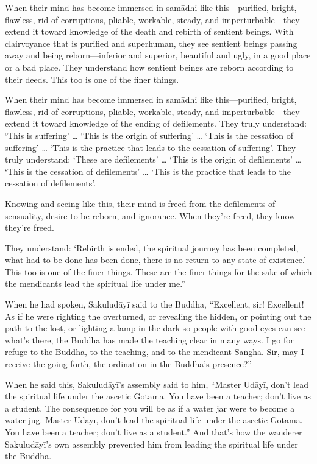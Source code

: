 \documentclass[12pt,openany]{book}%
\begin{document}
When their mind has become immersed in \textsanskrit{samādhi} like this—purified, bright, flawless, rid of corruptions, pliable, workable, steady, and imperturbable—they extend it toward knowledge of the death and rebirth of sentient beings. With clairvoyance that is purified and superhuman, they see sentient beings passing away and being reborn—inferior and superior, beautiful and ugly, in a good place or a bad place. They understand how sentient beings are reborn according to their deeds. This too is one of the finer things. 

When their mind has become immersed in \textsanskrit{samādhi} like this—purified, bright, flawless, rid of corruptions, pliable, workable, steady, and imperturbable—they extend it toward knowledge of the ending of defilements. They truly understand: ‘This is suffering’ … ‘This is the origin of suffering’ … ‘This is the cessation of suffering’ … ‘This is the practice that leads to the cessation of suffering’. They truly understand: ‘These are defilements’ … ‘This is the origin of defilements’ … ‘This is the cessation of defilements’ … ‘This is the practice that leads to the cessation of defilements’. 

Knowing and seeing like this, their mind is freed from the defilements of sensuality, desire to be reborn, and ignorance. When they’re freed, they know they’re freed. 

They understand: ‘Rebirth is ended, the spiritual journey has been completed, what had to be done has been done, there is no return to any state of existence.’ This too is one of the finer things. These are the finer things for the sake of which the mendicants lead the spiritual life under me.” 

When he had spoken, \textsanskrit{Sakuludāyī} said to the Buddha, “Excellent, sir! Excellent! As if he were righting the overturned, or revealing the hidden, or pointing out the path to the lost, or lighting a lamp in the dark so people with good eyes can see what’s there, the Buddha has made the teaching clear in many ways. I go for refuge to the Buddha, to the teaching, and to the mendicant \textsanskrit{Saṅgha}. Sir, may I receive the going forth, the ordination in the Buddha’s presence?” 

When he said this, \textsanskrit{Sakuludāyī}’s assembly said to him, “Master \textsanskrit{Udāyī}, don’t lead the spiritual life under the ascetic Gotama. You have been a teacher; don’t live as a student. The consequence for you will be as if a water jar were to become a water jug. Master \textsanskrit{Udāyī}, don’t lead the spiritual life under the ascetic Gotama. You have been a teacher; don’t live as a student.” And that’s how the wanderer \textsanskrit{Sakuludāyī}’s own assembly prevented him from leading the spiritual life under the Buddha. 
\end{document}
